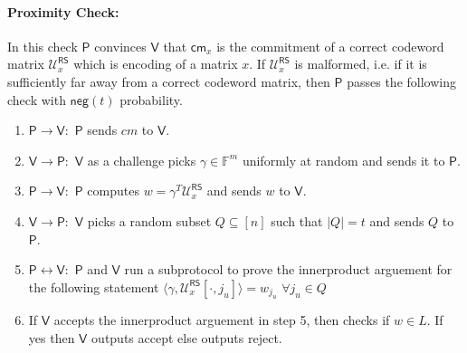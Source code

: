 \documentclass[runningheads]{llncs}
\newcommand{\innp}[2]{\langle #1,#2\rangle}
\def\prover{\mathsf{P}}
\def\verifier{\mathsf{V}}
\def\RS{\mathsf{RS}} %
\def\cm{\mathsf{cm}} %
\def\negl{\mathsf{neg}}
\def\oracle{\mathcal{U}^{\RS}}
\def\bbF{\mathbb{F}}
\begin{document}
\paragraph{\textbf{Proximity Check:}}\label{sec:proximity} In this check $\prover$ convinces $\verifier$ that $\cm_x$ is the commitment of a correct codeword matrix $\oracle_x$ which is encoding of a matrix $x$. If $\oracle_x$ is malformed, i.e. if it is sufficiently far away from a correct codeword matrix, then $\prover$ passes the following check with $\negl(t)$ probability.
	\begin{enumerate}
		\item $\prover \rightarrow \verifier :$ $\prover$ sends $cm$ to $\verifier$.
		\item $\verifier \rightarrow \prover :$ $\verifier$ as a challenge picks $\gamma \in \bbF^m$ uniformly at random and sends it to $\prover$.
		\item $\prover \rightarrow \verifier :$ $\prover$ computes $w=\gamma^T\oracle_x$ and sends $w$ to $\verifier$.
		\item $\verifier \rightarrow \prover :$ $\verifier$ picks a random subset $Q\subseteq [n]$ such that $|Q|=t$ and sends $Q$ to $\prover$.
		\item $\prover \leftrightarrow \verifier: $ $\prover$ and $\verifier$ run a subprotocol to prove the innerproduct arguement for the following statement $\innp{\gamma}{\oracle_x[\cdot,j_u]}=w_{j_u}$ $\forall j_u\in Q$
		\item If $\verifier$ accepts the innerproduct arguement in step 5, then checks if $w\in L$. If yes then $\verifier$ outputs accept else outputs reject.
	\end{enumerate}
	
\end{document}
